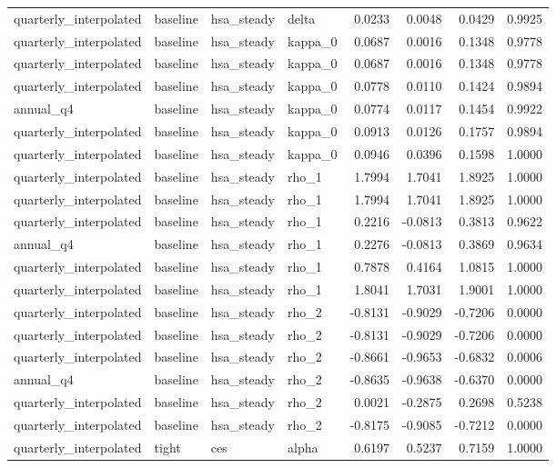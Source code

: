\begin{tabular}{llllrrrr}
quarterly\_interpolated & baseline & hsa\_steady & delta & 0.0233 & 0.0048 & 0.0429 & 0.9925 \\
quarterly\_interpolated & baseline & hsa\_steady & kappa\_0 & 0.0687 & 0.0016 & 0.1348 & 0.9778 \\
quarterly\_interpolated & baseline & hsa\_steady & kappa\_0 & 0.0687 & 0.0016 & 0.1348 & 0.9778 \\
quarterly\_interpolated & baseline & hsa\_steady & kappa\_0 & 0.0778 & 0.0110 & 0.1424 & 0.9894 \\
annual\_q4 & baseline & hsa\_steady & kappa\_0 & 0.0774 & 0.0117 & 0.1454 & 0.9922 \\
quarterly\_interpolated & baseline & hsa\_steady & kappa\_0 & 0.0913 & 0.0126 & 0.1757 & 0.9894 \\
quarterly\_interpolated & baseline & hsa\_steady & kappa\_0 & 0.0946 & 0.0396 & 0.1598 & 1.0000 \\
quarterly\_interpolated & baseline & hsa\_steady & rho\_1 & 1.7994 & 1.7041 & 1.8925 & 1.0000 \\
quarterly\_interpolated & baseline & hsa\_steady & rho\_1 & 1.7994 & 1.7041 & 1.8925 & 1.0000 \\
quarterly\_interpolated & baseline & hsa\_steady & rho\_1 & 0.2216 & -0.0813 & 0.3813 & 0.9622 \\
annual\_q4 & baseline & hsa\_steady & rho\_1 & 0.2276 & -0.0813 & 0.3869 & 0.9634 \\
quarterly\_interpolated & baseline & hsa\_steady & rho\_1 & 0.7878 & 0.4164 & 1.0815 & 1.0000 \\
quarterly\_interpolated & baseline & hsa\_steady & rho\_1 & 1.8041 & 1.7031 & 1.9001 & 1.0000 \\
quarterly\_interpolated & baseline & hsa\_steady & rho\_2 & -0.8131 & -0.9029 & -0.7206 & 0.0000 \\
quarterly\_interpolated & baseline & hsa\_steady & rho\_2 & -0.8131 & -0.9029 & -0.7206 & 0.0000 \\
quarterly\_interpolated & baseline & hsa\_steady & rho\_2 & -0.8661 & -0.9653 & -0.6832 & 0.0006 \\
annual\_q4 & baseline & hsa\_steady & rho\_2 & -0.8635 & -0.9638 & -0.6370 & 0.0000 \\
quarterly\_interpolated & baseline & hsa\_steady & rho\_2 & 0.0021 & -0.2875 & 0.2698 & 0.5238 \\
quarterly\_interpolated & baseline & hsa\_steady & rho\_2 & -0.8175 & -0.9085 & -0.7212 & 0.0000 \\
quarterly\_interpolated & tight & ces & alpha & 0.6197 & 0.5237 & 0.7159 & 1.0000 \\

\end{tabular}
